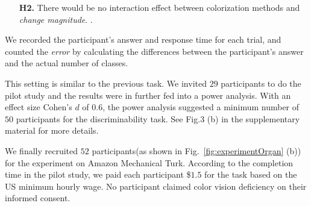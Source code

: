 {\begin{itemize}[noitemsep]

    \item [\textbf{H2.}] There would be no interaction effect between colorization methods and \emph{change magnitude}. .
\end{itemize}

\vspace{.3em}
We recorded the participant's answer and response time for each trial, and counted the \emph{error}  by calculating the differences between the participant's answer and the actual number of classes.


\vspace{.3em}
This setting is similar to the previous task. We invited $29$ participants to do the pilot study and the results were in further fed into a power analysis. With an effect size Cohen's $d$ of $0.6$, the power analysis suggested a minimum number of $50$ participants for the discriminability task.  See Fig.3 (b) in the supplementary material for more details.

\vspace{.3em}
We finally recruited $52$ participants(as shown in Fig.~\ref{fig:experimentOrgan} (b)) for the experiment on Amazon Mechanical Turk.
According to the completion time in the pilot study, we paid each participant \$$1.5$ for the task based on the US minimum hourly wage.
No participant claimed color vision deficiency on their informed consent.


}
